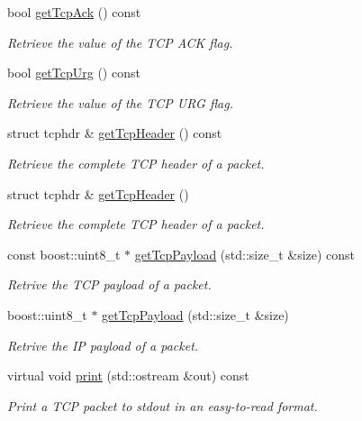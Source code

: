 \begin{DoxyCompactItemize}
bool \hyperlink{classIPQ_1_1IpqTcpPacket_a45a7f295cfd6375e3a5a4b6e06ec9a47}{get\-Tcp\-Ack} () const 
\begin{DoxyCompactList}\small\item\em \-Retrieve the value of the \-T\-C\-P \-A\-C\-K flag. \end{DoxyCompactList}\item 
bool \hyperlink{classIPQ_1_1IpqTcpPacket_a28ed0e72fe9d25a7bbc5f03e1e91fcb9}{get\-Tcp\-Urg} () const 
\begin{DoxyCompactList}\small\item\em \-Retrieve the value of the \-T\-C\-P \-U\-R\-G flag. \end{DoxyCompactList}\item 
struct tcphdr \& \hyperlink{classIPQ_1_1IpqTcpPacket_a10987837a2b53336b43d059a74d00808}{get\-Tcp\-Header} () const 
\begin{DoxyCompactList}\small\item\em \-Retrieve the complete \-T\-C\-P header of a packet. \end{DoxyCompactList}\item 
struct tcphdr \& \hyperlink{classIPQ_1_1IpqTcpPacket_a170fa508e31ca3d0330f839224297240}{get\-Tcp\-Header} ()
\begin{DoxyCompactList}\small\item\em \-Retrieve the complete \-T\-C\-P header of a packet. \end{DoxyCompactList}\item 
const boost\-::uint8\-\_\-t $\ast$ \hyperlink{classIPQ_1_1IpqTcpPacket_ac56d211c471b6a721695f40762f7e411}{get\-Tcp\-Payload} (std\-::size\-\_\-t \&size) const 
\begin{DoxyCompactList}\small\item\em \-Retrive the \-T\-C\-P payload of a packet. \end{DoxyCompactList}\item 
boost\-::uint8\-\_\-t $\ast$ \hyperlink{classIPQ_1_1IpqTcpPacket_a9b90d7f24d2a48ce5627df74bdd05270}{get\-Tcp\-Payload} (std\-::size\-\_\-t \&size)
\begin{DoxyCompactList}\small\item\em \-Retrive the \-I\-P payload of a packet. \end{DoxyCompactList}\item 
virtual void \hyperlink{classIPQ_1_1IpqTcpPacket_a751f98aa2aafbe6796bf3a82d7273bec}{print} (std\-::ostream \&out) const 
\begin{DoxyCompactList}\small\item\em \-Print a \-T\-C\-P packet to stdout in an easy-\/to-\/read format. \end{DoxyCompactList}\item 

\end{DoxyCompactItemize}
